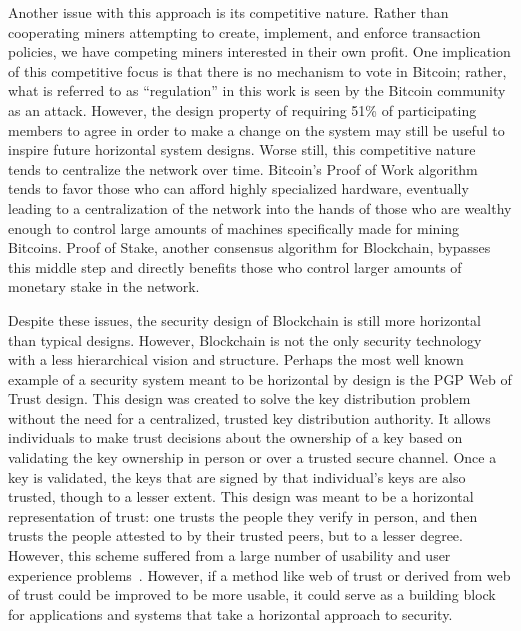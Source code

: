 Another issue with this approach is its competitive nature. Rather than
cooperating miners attempting to create, implement, and enforce transaction
policies, we have competing miners interested in their own profit. One
implication of this competitive focus is that there is no mechanism to vote in
Bitcoin; rather, what is referred to as ``regulation'' in this work is seen by
the Bitcoin community as an attack. However, the design property of requiring
51\% of participating members to agree in order to make a change on the system
may still be useful to inspire future horizontal system designs. Worse still,
this competitive nature tends to centralize the network over time. Bitcoin's
Proof of Work algorithm tends to favor those who can afford highly specialized
hardware, eventually leading to a centralization of the network into the hands
of those who are wealthy enough to control large amounts of machines
specifically made for mining Bitcoins. Proof of Stake, another consensus
algorithm for Blockchain, bypasses this middle step and directly benefits those
who control larger amounts of monetary stake in the network.


Despite these issues, the security design of Blockchain is still more horizontal
than typical designs. However, Blockchain is not the only security technology
with a less hierarchical vision and structure. Perhaps the most well known
example of a security system meant to be horizontal by design is the PGP Web of
Trust design. This design was created to solve the key distribution problem
without the need for a centralized, trusted key distribution authority. It
allows individuals to make trust decisions about the ownership of a key based on
validating the key ownership in person or over a trusted secure channel. Once a
key is validated, the keys that are signed by that individual's keys are also
trusted, though to a lesser extent. This design was meant to be a horizontal
representation of trust: one trusts the people they verify in person, and then
trusts the people attested to by their trusted peers, but to a lesser degree.
However, this scheme suffered from a large number of usability and user
experience problems~\cite{whitten1999johnny}. However, if a method like web of
trust or derived from web of trust could be improved to be more usable, it could
serve as a building block for applications and systems that take a horizontal
approach to security.

